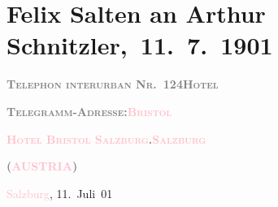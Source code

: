 

\renewcommand{\erwaehntePersonen}{Personen: Hugo Felix, Georges Fragerolle, Henri Rivière, Julius Szeps}
\renewcommand{\erwaehnteInstitutionen}{Institutionen: Jung-Wiener Theater zum Lieben Augustin, Le Chat Noir, Wiener Allgemeine Zeitung}
\renewcommand{\erwaehnteOrte}{Orte: Arlberg, Bad Ischl, Darmstadt, Hotel Bristol Salzburg, Innsbruck, Salzburg, St. Anton am Arlberg, Wien, Zürich, Österreich}
\renewcommand{\erwaehnteWerke}{Werke: Frau Bertha Garlan. Roman, Wiener Allgemeine Zeitung, »Lieutenant Gustl.« (Ein ehrenrätliches Urtheil.)}
\section[ Felix Salten an Arthur Schnitzler, 11. 7. 1901]{Felix Salten an Arthur Schnitzler, 11. 7. 1901}
\nopagebreak{}
\rehead{ }\normalsize\beginnumbering{}
\toendnotes[C]{\smallbreak\pagebreak[2]}
\toendnotes[C]{\smallbreak}
\pstart
           \noindent{}{\pb}\textcolor{gray}{\textbf{\textsc{Telephon interurban Nr. 124}}}\hfill \textcolor{gray}{\textbf{\textsc{Hotel}}}\pend
           
\pstart
           \textcolor{gray}{\textbf{\textsc{Telegramm-Adresse:}}}\hfill \textcolor{gray}{\textbf{\textsc{\textcolor{pink}{Bristol}{}\ledrightnote{\textcolor{pink}{Hotel Bristol Salzburg}}}}}\pend
           
\pstart
           \textcolor{gray}{\textbf{\textsc{\textcolor{pink}{\textbf{H}otel \textbf{B}ristol \textbf{S}alzburg}{}\ledrightnote{\textcolor{pink}{Hotel Bristol Salzburg}}}.}}\hfill \textcolor{gray}{\textbf{\textsc{\textcolor{pink}{Salzburg}{}\ledrightnote{\textcolor{pink}{Salzburg}}}}}\pend
           
\pstart
           \raggedleft{}\textcolor{gray}{\textbf{(\textcolor{pink}{AUSTRIA}{}\ledrightnote{\textcolor{pink}{Österreich}})}}\pend
           
\pstart
           \raggedleft{}\textcolor{pink}{Salzburg}{}\ledrightnote{\textcolor{pink}{Salzburg}}, 11. Juli 01\pend
           
